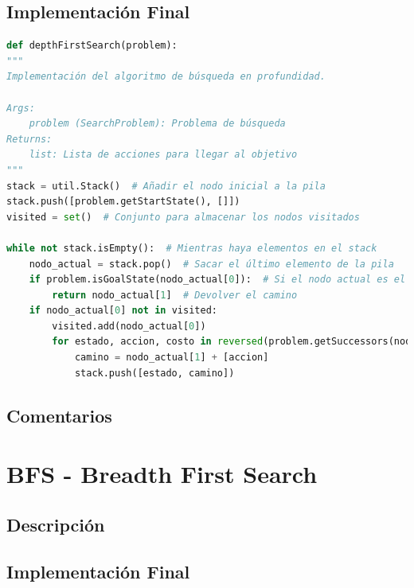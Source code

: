 \documentclass{report}
\begin{document}
        \subsection*{Implementación Final}
          \begin{lstlisting}[language=Python, caption=Implementación final del DFS]
def depthFirstSearch(problem):
"""
Implementación del algoritmo de búsqueda en profundidad.

Args:
    problem (SearchProblem): Problema de búsqueda
Returns:
    list: Lista de acciones para llegar al objetivo
"""
stack = util.Stack()  # Añadir el nodo inicial a la pila
stack.push([problem.getStartState(), []])
visited = set()  # Conjunto para almacenar los nodos visitados

while not stack.isEmpty():  # Mientras haya elementos en el stack
    nodo_actual = stack.pop()  # Sacar el último elemento de la pila
    if problem.isGoalState(nodo_actual[0]):  # Si el nodo actual es el objetivo
        return nodo_actual[1]  # Devolver el camino
    if nodo_actual[0] not in visited:
        visited.add(nodo_actual[0])
        for estado, accion, costo in reversed(problem.getSuccessors(nodo_actual[0])): 
            camino = nodo_actual[1] + [accion]
            stack.push([estado, camino])
          \end{lstlisting}
        \subsection*{Comentarios}
          \paragraph*{}{

          }
      \clearpage\section{BFS - Breadth First Search}
        \subsection*{Descripción}
          \paragraph*{}{

          }
        \subsection*{Implementación Final}
\end{document}
